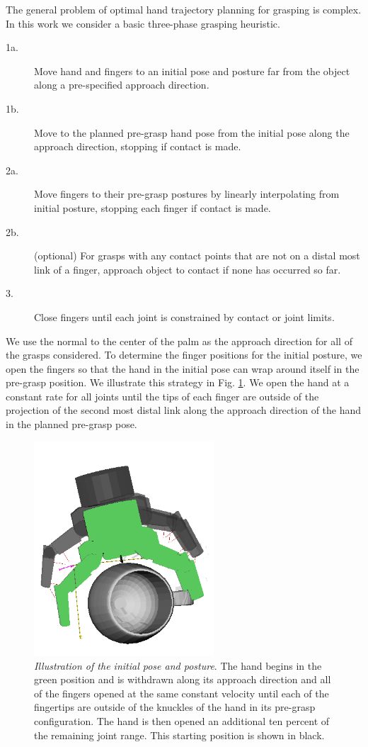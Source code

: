 The general problem of optimal hand trajectory planning for grasping is complex.  In this work we consider a basic three-phase grasping heuristic.
\begin{description}
\item[1a.]Move hand and fingers to an initial pose and posture far from the object along a pre-specified approach direction.
\item[1b.]Move to the planned pre-grasp hand pose from the initial pose along the approach direction, stopping if contact is made.
\item[2a.]Move fingers to their pre-grasp postures by linearly interpolating from initial posture, stopping each finger if contact is made.  
\item[2b.](optional) For grasps with any contact points that are not on a distal most link of a finger, approach object to contact if none has occurred so far. 
\item[3.]Close fingers until each joint is constrained by contact or joint limits.
\end{description}
We use the normal to the center of the palm as the
approach direction for all of the grasps considered. To
determine the finger positions for the initial posture, we
open the fingers so that the hand in the initial pose can
wrap around itself in the pre-grasp position. We illustrate
this strategy in Fig. \ref{fig:initial_pose}. We open the hand at a constant rate
for all joints until the tips of each finger are outside of the
projection of the second most distal link along the approach
direction of the hand in the planned pre-grasp pose. \par
\begin{figure}[ht]
\centering
\includegraphics[height = 80mm]{initial_pose.png}
\caption{ \emph{Illustration of the initial pose and posture}. The hand begins in the green position and is withdrawn along its approach direction and all of the fingers opened at the same constant velocity until each of the fingertips are outside of the knuckles of the hand in its pre-grasp configuration. The hand is then opened an additional ten percent of the remaining joint range. This starting position is shown in black.}
\label{fig:initial_pose}
\end{figure}

